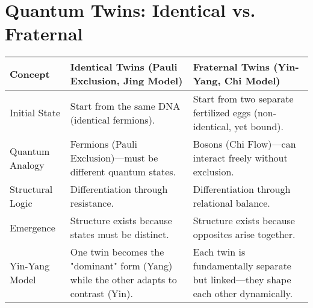 \documentclass{article}
\begin{document}
\section*{Quantum Twins: Identical vs. Fraternal}

\renewcommand{\arraystretch}{1.5} %

\begin{tabular}{|p{4.2cm}|p{5.2cm}|p{5.2cm}|}
\hline
\textbf{Concept} & \textbf{Identical Twins (Pauli Exclusion, Jing Model)} & \textbf{Fraternal Twins (Yin-Yang, Chi Model)} \\
\hline
Initial State & 
Start from the same DNA (identical fermions). & 
Start from two separate fertilized eggs (non-identical, yet bound). \\
\hline
Quantum Analogy & 
Fermions (Pauli Exclusion)—must be different quantum states. & 
Bosons (Chi Flow)—can interact freely without exclusion. \\
\hline
Structural Logic & 
Differentiation through resistance. & 
Differentiation through relational balance. \\
\hline
Emergence & 
Structure exists because states must be distinct. & 
Structure exists because opposites arise together. \\
\hline
Yin-Yang Model & 
One twin becomes the "dominant" form (Yang) while the other adapts to contrast (Yin). & 
Each twin is fundamentally separate but linked—they shape each other dynamically. \\
\hline
\end{tabular}
\end{document}
